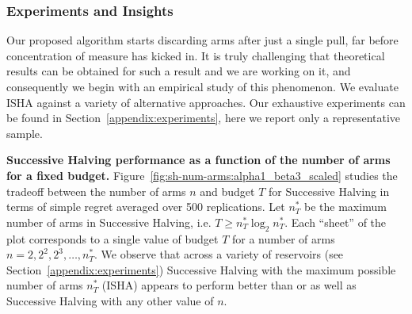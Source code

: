 \subsubsection{Experiments and Insights}\label{fb-experiments}
Our proposed algorithm starts discarding arms after just a single pull, far before concentration of measure has kicked in. 
It is truly challenging that theoretical results can be obtained for such a result and we are working on it, and consequently we begin with an empirical study of this phenomenon. 
We evaluate ISHA against a variety of alternative approaches. Our exhaustive experiments can be found in Section~\ref{appendix:experiments}, here we report only a representative sample.

\textbf{Successive Halving performance as a function of the number of arms for a fixed budget.}
Figure~\ref{fig:sh-num-arms:alpha1_beta3_scaled} studies the tradeoff between the number of arms $n$ and budget $T$ for Successive Halving in terms of simple regret averaged over 500 replications. Let $n^*_T$ be the maximum number of arms in Successive Halving,
i.e. $T \geq n^*_T \log_2 n^*_T$.
Each ``sheet'' of the plot corresponds to a single value of budget $T$ for a number of arms $n=2,2^2,2^3,\dots,n^*_T$.
We observe that across a variety of reservoirs (see Section~\ref{appendix:experiments}) Successive Halving with the maximum possible number of arms $n^*_T$ (ISHA) appears to perform better than or as well as Successive Halving with any other value of $n$.



